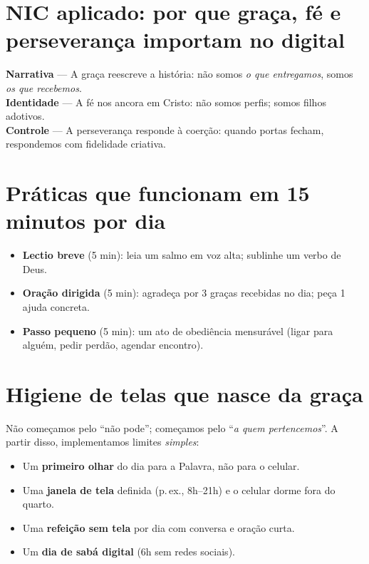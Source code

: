\section{NIC aplicado: por que graça, fé e perseverança importam no digital}
\begin{nicbox}
\textbf{Narrativa} --- A graça reescreve a história: não somos \emph{o que entregamos}, somos \emph{os que recebemos}.\\
\textbf{Identidade} --- A fé nos ancora em Cristo: não somos perfis; somos filhos adotivos.\\
\textbf{Controle} --- A perseverança responde à coerção: quando portas fecham, respondemos com fidelidade criativa.
\end{nicbox}

\section{Práticas que funcionam em 15 minutos por dia}
\begin{checklist}
\begin{itemize}[leftmargin=*,noitemsep]
  \item \textbf{Lectio breve} (5 min): leia um salmo em voz alta; sublinhe um verbo de Deus.
  \item \textbf{Oração dirigida} (5 min): agradeça por 3 graças recebidas no dia; peça 1 ajuda concreta.
  \item \textbf{Passo pequeno} (5 min): um ato de obediência mensurável (ligar para alguém, pedir perdão, agendar encontro).
\end{itemize}
\end{checklist}

\section{Higiene de telas que nasce da graça}
Não começamos pelo “não pode”; começamos pelo “\textit{a quem pertencemos}”. A partir disso, implementamos limites \emph{simples}:
\begin{checklist}[title={Regra de bolso (7 dias)}]
\begin{itemize}[leftmargin=*,noitemsep]
  \item Um \textbf{primeiro olhar} do dia para a Palavra, não para o celular.
  \item Uma \textbf{janela de tela} definida (p.\,ex., 8h–21h) e o celular dorme fora do quarto.
  \item Uma \textbf{refeição sem tela} por dia com conversa e oração curta.
  \item Um \textbf{dia de sabá digital} (6h sem redes sociais).
\end{itemize}
\end{checklist}

